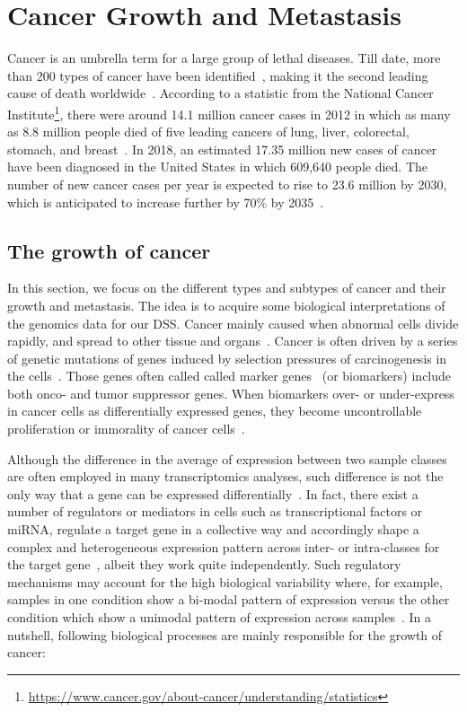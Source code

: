 \section{Cancer Growth and Metastasis}
\label{cancer_growth}
Cancer is an umbrella term for a large group of lethal diseases. Till date, more than 200 types of cancer have been identified~\cite{82Tomczak}, making it the second leading cause of death worldwide~\cite{pancan}. According to a statistic from the National Cancer Institute\footnote{\url{https://www.cancer.gov/about-cancer/understanding/statistics}}, there were around 14.1 million cancer cases in 2012 in which as many as 8.8 million people died of five leading cancers of lung, liver, colorectal, stomach, and breast~\cite{stat}. In 2018, an estimated 17.35 million new cases of cancer have been diagnosed in the United States in which 609,640 people died. The number of new cancer cases per year is expected to rise to 23.6 million by 2030, which is anticipated to increase further by 70\% by 2035~\cite{71Torre}. 

\subsection{The growth of cancer}
In this section, we focus on the different types and subtypes of cancer and their growth and metastasis. The idea is to acquire some biological interpretations of the genomics data for our DSS. Cancer mainly caused when abnormal cells divide rapidly, and spread to other tissue and organs~\cite{pancan}. Cancer is often  driven by a series of genetic mutations of genes induced by selection pressures of carcinogenesis in the cells~\cite{ghazani2017assigning, baker2015cancer}. Those genes often called called marker genes ~(or biomarkers) include both onco- and tumor suppressor genes. When biomarkers over- or under-express in cancer cells as differentially expressed genes, they become uncontrollable proliferation or immorality of cancer cells~\cite{ghazani2017assigning, baker2015cancer}. 

\hspace*{3.5mm} Although the difference in the average of expression between two sample classes are often employed in many transcriptomics analyses, such difference is not the only way that a gene can be expressed differentially~\cite{xie2018adaptively}. In fact, there exist a number of regulators or mediators in cells such as transcriptional factors or miRNA, regulate a target gene in a collective way and accordingly shape a complex and heterogeneous expression pattern across inter- or intra-classes for the target gene~\cite{ghazani2017assigning, baker2015cancer}, albeit they work quite independently. Such regulatory mechanisms may account for the high biological variability where, for example, samples in one condition show a bi-modal pattern of expression versus the other condition which show a unimodal pattern of expression across samples~\cite{xie2018adaptively}. In a nutshell, following biological processes are mainly responsible for the growth of cancer: 

